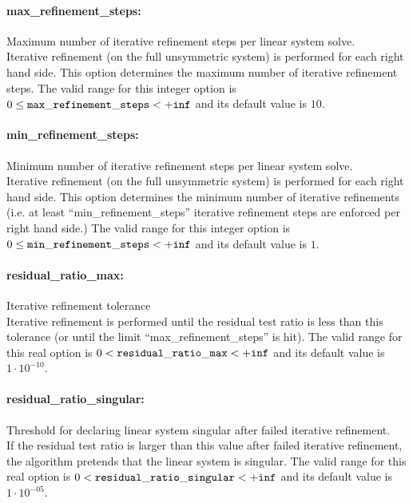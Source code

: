 \paragraph{max\_refinement\_steps:} Maximum number of iterative refinement steps per linear system solve. $\;$ \\
 Iterative refinement (on the full unsymmetric
system) is performed for each right hand side. 
This option determines the maximum number of
iterative refinement steps. The valid range for this integer option is
$0 \le {\tt max\_refinement\_steps } <  {\tt +inf}$
and its default value is $10$.


\paragraph{min\_refinement\_steps:} Minimum number of iterative refinement steps per linear system solve. $\;$ \\
 Iterative refinement (on the full unsymmetric
system) is performed for each right hand side. 
This option determines the minimum number of
iterative refinements (i.e. at least
``min\_refinement\_steps'' iterative refinement
steps are enforced per right hand side.) The valid range for this integer option is
$0 \le {\tt min\_refinement\_steps } <  {\tt +inf}$
and its default value is $1$.

\paragraph{residual\_ratio\_max:} Iterative refinement tolerance $\;$ \\
 Iterative refinement is performed until the
residual test ratio is less than this tolerance
(or until the limit ``max\_refinement\_steps'' is hit). The valid range for this real option is 
$0 <  {\tt residual\_ratio\_max } <  {\tt +inf}$
and its default value is $1 \cdot 10^{-10}$.


\paragraph{residual\_ratio\_singular:} Threshold for declaring linear system singular after failed iterative refinement. $\;$ \\
 If the residual test ratio is larger than this
value after failed iterative refinement, the
algorithm pretends that the linear system is
singular. The valid range for this real option is 
$0 <  {\tt residual\_ratio\_singular } <  {\tt +inf}$
and its default value is $1 \cdot 10^{-05}$.


